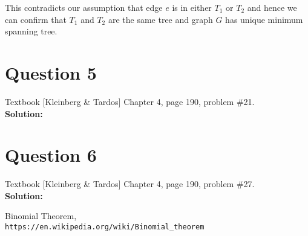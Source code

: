 \documentclass[11pt]{article}
\begin{document}
This contradicts our assumption that edge $ e $ is in either $ T_1 $ or $ T_2 $ and hence we can confirm that $ T_1 $ and $ T_2 $ are the same tree and graph $ G $ has unique minimum spanning tree.

\clearpage
\section{Question 5} Textbook [Kleinberg \& Tardos] Chapter 4, page 190, problem \#21. \\
\textbf{Solution:} \\

\clearpage
\section{Question 6} Textbook [Kleinberg \& Tardos] Chapter 4, page 190, problem \#27. \\
\textbf{Solution:} \\

\clearpage

\begin{thebibliography}{9}
	Binomial Theorem,
	\\\texttt{https://en.wikipedia.org/wiki/Binomial\_theorem}
	
\end{thebibliography}
\end{document}
